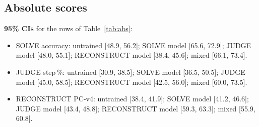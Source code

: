 \documentclass[10pt,a4paper]{article}
\begin{document}
\subsection{Absolute scores}
\begin{table}[H]
\centering\footnotesize
\caption{Test scores (pass@1 unless noted; 95\% CI). False alarm: lower is better.}
\label{tab:abs}
\end{table}

\noindent\textbf{95\% CIs} for the rows of Table~\ref{tab:abs}:
\begin{itemize}
\item SOLVE accuracy: untrained [48.9, 56.2]; SOLVE model [65.6, 72.9]; JUDGE model [48.0, 55.1]; RECONSTRUCT model
      [38.4, 45.6]; mixed [66.1, 73.4].
\item JUDGE step\,\%: untrained [30.9, 38.5]; SOLVE model [36.5, 50.5]; JUDGE model [45.0, 58.5]; RECONSTRUCT model
      [42.5, 56.0]; mixed [60.0, 73.5].
\item RECONSTRUCT PC-v4: untrained [38.4, 41.9]; SOLVE model [41.2, 46.6]; JUDGE model [43.4, 48.8]; RECONSTRUCT
      model [59.3, 63.3]; mixed [55.9, 60.8].
\end{itemize}
\end{document}
